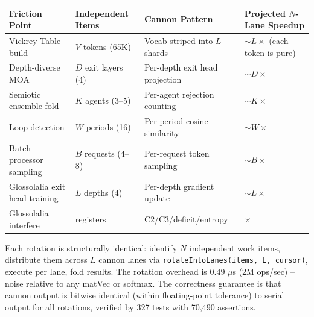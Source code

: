 \documentclass[
  11pt,
]{article}
\newcounter{none} %
\begin{document}
{\def\LTcaptype{none}
\begin{longtable}[]{@{}
  >{\raggedright\arraybackslash}p{}
  >{\raggedright\arraybackslash}p{}
  >{\raggedright\arraybackslash}p{}
  >{\raggedright\arraybackslash}p{}@{}}
\toprule\noalign{}
\begin{minipage}[b]{\linewidth}\raggedright
Friction Point
\end{minipage} & \begin{minipage}[b]{\linewidth}\raggedright
Independent Items
\end{minipage} & \begin{minipage}[b]{\linewidth}\raggedright
Cannon Pattern
\end{minipage} & \begin{minipage}[b]{\linewidth}\raggedright
Projected \(N\)-Lane Speedup
\end{minipage} \\
\midrule\noalign{}
\endhead
\bottomrule\noalign{}
\endlastfoot
Vickrey Table build & \(V\) tokens (65K) & Vocab striped into \(L\) shards & \(\sim L\times\) (each token is pure) \\
Depth-diverse MOA & \(D\) exit layers (4) & Per-depth exit head projection & \(\sim D\times\) \\
Semiotic ensemble fold & \(K\) agents (3--5) & Per-agent rejection counting & \(\sim K\times\) \\
Loop detection & \(W\) periods (16) & Per-period cosine similarity & \(\sim W\times\) \\
Batch processor sampling & \(B\) requests (4--8) & Per-request token sampling & \(\sim B\times\) \\
Glossolalia exit head training & \(L\) depths (4) & Per-depth gradient update & \(\sim L\times\) \\
Glossolalia interfere & 4 registers & C2/C3/deficit/entropy & 4\(\times\) \\
\end{longtable}
}

Each rotation is structurally identical: identify \(N\) independent work items, distribute them across \(L\) cannon lanes via \texttt{rotateIntoLanes(items, L, cursor)}, execute per lane, fold results.  The rotation overhead is 0.49 \(\mu\)s (2M ops/sec) -- noise relative to any matVec or softmax.  The correctness guarantee is that cannon output is bitwise identical (within floating-point tolerance) to serial output for all rotations, verified by 327 tests with 70,490 assertions.
\end{document}
